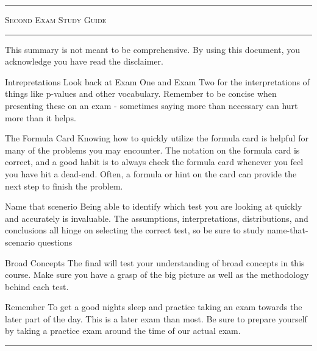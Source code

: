 \documentclass[landscape]{article}
\title{}
\author{}
\newcommand{\myline}{\vspace{4pt}\hrule  \vspace{4pt}}
\newenvironment{topic}[1]{
	\noindent \textbf{\textsc{\color{harvardcrimson}{#1}}}
	\noindent \hspace{-3.5pt}
}{
	\myline
}
\newenvironment{compactdesc}{
	\begin{description}[leftmargin=1em,labelsep=0.7em, font=\normalfont\itshape]
	}{
	\end{description}
}
\begin{document}
	\footnotesize

	\begin{multicols*}{3}
	\hfill
	\vspace{-1\baselineskip}
	\hfill
	
	\myline
	\vspace{-0.2cm}
	\begin{center}
		\LARGE \textsc{Second Exam Study Guide} 
	\end{center}
	\vspace{-0.2cm}
	\myline 
	
		
	\begin{topic}{Introduction}
		This summary is not meant to be comprehensive. By using this document, you acknowledge you have read the disclaimer.
		\begin{compactdesc}
			\item[Intrepretations] Look back at Exam One and Exam Two for the interpretations of things like p-values and other vocabulary. Remember to be concise when presenting these on an exam - sometimes saying more than necessary can hurt more than it helps.
			\item[The Formula Card] Knowing how to quickly utilize the formula card is helpful for many of the problems you may encounter. The notation on the formula card is correct, and a good habit is to always check the formula card whenever you feel you have hit a dead-end. Often, a formula or hint on the card can provide the next step to finish the problem. 
			\item[Name that scenerio] Being able to identify which test you are looking at quickly and accurately is invaluable. The assumptions, interpretations, distributions, and conclusions all hinge on selecting the correct test, so be sure to study name-that-scenario questions
			\item[Broad Concepts] The final will test your understanding of broad concepts in this course. Make sure you have a grasp of the big picture as well as the methodology behind each test. 
			\item[Remember] To get a good nights sleep and practice taking an exam towards the later part of the day. This is a later exam than most. Be sure to prepare yourself by taking a practice exam around the time of our actual exam. 
		\end{compactdesc}
	\end{topic}
	

\end{multicols*}
\end{document}
